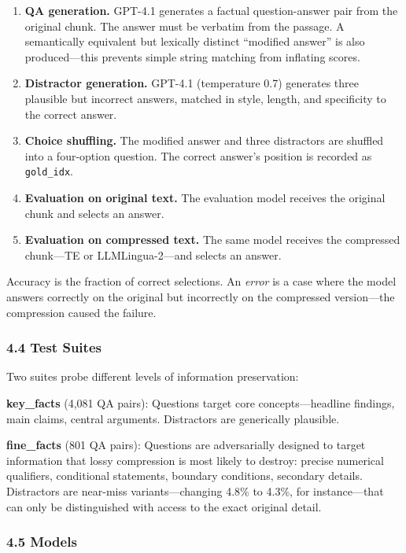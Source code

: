 \documentclass[
]{article}
\begin{document}
\begin{enumerate}
\def\labelenumi{\arabic{enumi}.}
\item
  \textbf{QA generation.} GPT-4.1 generates a factual question-answer
  pair from the original chunk. The answer must be verbatim from the
  passage. A semantically equivalent but lexically distinct ``modified
  answer'' is also produced---this prevents simple string matching from
  inflating scores.
\item
  \textbf{Distractor generation.} GPT-4.1 (temperature 0.7) generates
  three plausible but incorrect answers, matched in style, length, and
  specificity to the correct answer.
\item
  \textbf{Choice shuffling.} The modified answer and three distractors
  are shuffled into a four-option question. The correct answer's
  position is recorded as \texttt{gold\_idx}.
\item
  \textbf{Evaluation on original text.} The evaluation model receives
  the original chunk and selects an answer.
\item
  \textbf{Evaluation on compressed text.} The same model receives the
  compressed chunk---TE or LLMLingua-2---and selects an answer.
\end{enumerate}

Accuracy is the fraction of correct selections. An \emph{error} is a
case where the model answers correctly on the original but incorrectly
on the compressed version---the compression caused the failure.

\subsubsection{4.4 Test Suites}\label{test-suites}

Two suites probe different levels of information preservation:

\textbf{key\_facts} (4,081 QA pairs): Questions target core
concepts---headline findings, main claims, central arguments.
Distractors are generically plausible.

\textbf{fine\_facts} (801 QA pairs): Questions are adversarially
designed to target information that lossy compression is most likely to
destroy: precise numerical qualifiers, conditional statements, boundary
conditions, secondary details. Distractors are near-miss
variants---changing 4.8\% to 4.3\%, for instance---that can only be
distinguished with access to the exact original detail.

\subsubsection{4.5 Models}\label{models}
\end{document}
